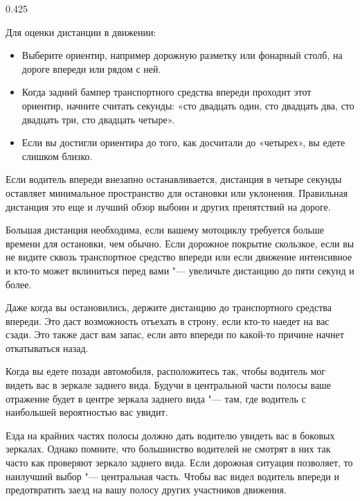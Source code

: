 \begin{langblock}{0.425}
\begin{rus}
		Для оценки дистанции в движении:
		\begin{itemize}[noitemsep]
			\item Выберите ориентир, например дорожную разметку или фонарный столб, на дороге впереди или рядом с ней.
			\item Когда задний бампер транспортного средства впереди проходит этот ориентир, начните считать секунды: «сто двадцать один, сто двадцать два, сто двадцать три, сто двадцать четыре».
			\item Если вы достигли ориентира до того, как досчитали до «четырех», вы едете слишком близко.
		\end{itemize}
		
		Если водитель впереди внезапно останавливается, дистанция в четыре секунды оставляет минимальное пространство для остановки или уклонения. Правильная дистанция это еще и лучший обзор выбоин и других препятствий на дороге.
		
		Большая дистанция необходима, если вашему мотоциклу требуется больше времени для остановки, чем обычно. Если дорожное покрытие скользкое, если вы не видите сквозь транспортное средство впереди или если движение интенсивное и кто-то может вклиниться перед вами "--- увеличьте дистанцию до пяти секунд и более.
		
		Даже когда вы остановились, держите дистанцию до транспортного средства впереди. Это даст возможность отъехать в строну, если кто-то наедет на вас сзади. Это также даст вам запас, если авто впереди по какой-то причине начнет откатываться назад.
		
		Когда вы едете позади автомобиля, расположитесь так, чтобы водитель мог видеть вас в зеркале заднего вида. Будучи в центральной части полосы ваше отражение будет в центре зеркала заднего вида "--- там, где водитель с наибольшей вероятностью вас увидит.
		
		Езда на крайних частях полосы должно дать водителю увидеть вас в боковых зеркалах. Однако помните, что большинство водителей не смотрят в них так часто как проверяют зеркало заднего вида. Если дорожная ситуация позволяет, то наилучший выбор "--- центральная часть. Чтобы вас видел водитель впереди и предотвратить заезд на вашу полосу других участников движения.
\end{rus}
\end{langblock}







